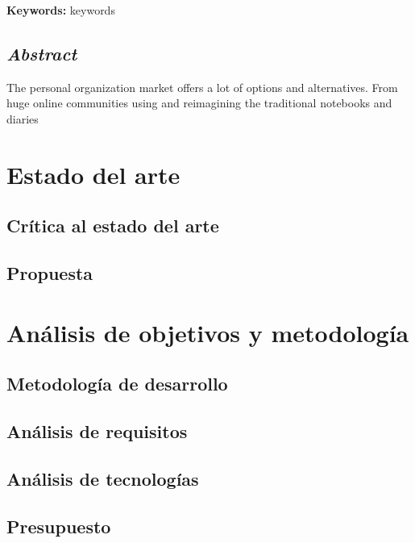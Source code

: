 \documentclass[10pt, a4paper]{aqademic}
\begin{document}
\newpage


\textbf{Keywords:} keywords


\section{\textit{Abstract}}

The personal organization market offers a lot of options and alternatives. From huge online communities using and reimagining the traditional notebooks and diaries


\chapter{Estado del arte}

\section{Crítica al estado del arte}

\section{Propuesta}


\chapter{Análisis de objetivos y metodología}

\section{Metodología de desarrollo}

\section{Análisis de requisitos}

\section{Análisis de tecnologías}

\section{Presupuesto}
\end{document}
